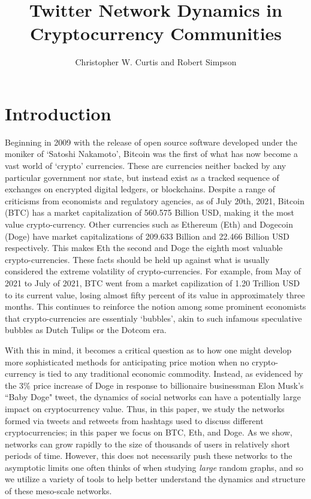 \documentclass[a4paper,11pt]{article}
\title{Twitter Network Dynamics in Cryptocurrency Communities}
\date{}
\begin{document}
\author{Christopher W. Curtis and Robert Simpson}
\maketitle

\section{Introduction}

Beginning in 2009 with the release of open source software developed under the moniker of `Satoshi Nakamoto', Bitcoin was the first of what has now become a vast world of `crypto' currencies.  These are currencies neither backed by any particular government nor state, but instead exist as a tracked sequence of exchanges on encrypted digital ledgers, or blockchains.  Despite a range of criticisms from economists and regulatory agencies, as of July 20th, 2021, Bitcoin (BTC) has a market capitalization of 560.575 Billion USD, making it the most value crypto-currency.  Other currencies such as Ethereum (Eth) and Dogecoin (Doge) have market capitalizations of 209.633 Billion and 22.466 Billion USD respectively.  This makes Eth the second and Doge the eighth most valuable crypto-currencies.  These facts should be held up against what is usually considered the extreme volatility of crypto-currencies.  For example, from May of 2021 to July of 2021, BTC went from a market capilization of 1.20 Trillion USD to its current value, losing almost fifty percent of its value in approximately three months.  This continues to reinforce the notion among some prominent economists that crypto-currencies are essentialy `bubbles', akin to such infamous speculative bubbles as Dutch Tulips or the Dotcom era.  

With this in mind, it becomes a critical question as to how one might develop more sophisticated methods for anticipating price motion when no crypto-currency is tied to any traditional economic commodity.  Instead, as evidenced by the 3\% price increase of Doge in response to billionaire businessman Elon Musk's ``Baby Doge" tweet, the dynamics of social networks can have a potentially large impact on cryptocurrency value.  Thus, in this paper, we study the networks formed via tweets and retweets from hashtags used to discuss different cryptocurrencies; in this paper we focus on BTC, Eth, and Doge.  As we show, networks can grow rapidly to the size of thousands of users in relatively short periods of time.  However, this does not necessarily push these networks to the asymptotic limits one often thinks of when studying {\it large} random graphs, and so we utilize a variety of tools to help better understand the dynamics and structure of these meso-scale networks.
\end{document}

